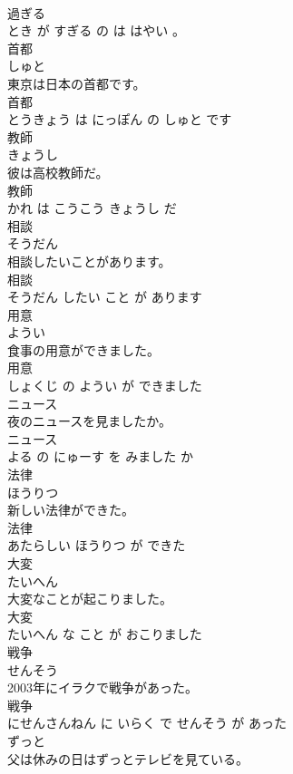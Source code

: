\documentclass[8pt]{extreport}
\begin{document}
\begin{CJK}{UTF8}{min}
\\	過ぎる 
\\	とき が すぎる の は はやい 。			
\\	首都	
\\	しゅと			
\\	東京は日本の首都です。	
\\	首都 
\\	とうきょう は にっぽん の しゅと です			
\\	教師	
\\	きょうし			
\\	彼は高校教師だ。	
\\	教師 
\\	かれ は こうこう きょうし だ			
\\	相談	
\\	そうだん			
\\	相談したいことがあります。	
\\	相談 
\\	そうだん したい こと が あります			
\\	用意	
\\	ようい			
\\	食事の用意ができました。	
\\	用意 
\\	しょくじ の ようい が できました			
\\	ニュース	
\\	夜のニュースを見ましたか。	
\\	ニュース 
\\	よる の にゅーす を みました か			
\\	法律	
\\	ほうりつ			
\\	新しい法律ができた。	
\\	法律 
\\	あたらしい ほうりつ が できた			
\\	大変	
\\	たいへん			
\\	大変なことが起こりました。	
\\	大変 
\\	たいへん な こと が おこりました			
\\	戦争	
\\	せんそう			
\\	2003年にイラクで戦争があった。	
\\	戦争 
\\	にせんさんねん に いらく で せんそう が あった			
\\	ずっと	
\\	父は休みの日はずっとテレビを見ている。	

\end{CJK}
\end{document}
